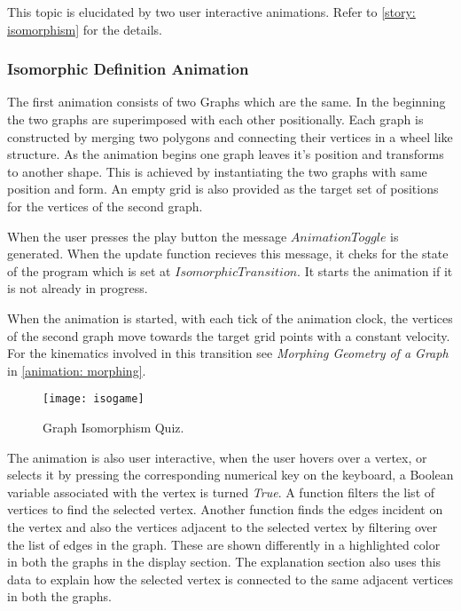 This topic is elucidated by two user interactive animations. Refer to
\autoref{story: isomorphism} for the details. 


\subsubsection{Isomorphic Definition Animation}
The first animation consists of two Graphs which are the same.  In the
beginning the two graphs are superimposed with each other positionally.  Each
graph is constructed by merging two polygons and connecting their vertices in a
wheel like structure. As the animation begins one graph leaves it's position
and transforms to another shape.  This is achieved by instantiating the two
graphs with same position and form. An empty grid is also provided as the
target set of positions for the vertices of the second graph. 

When the user presses the play button the message $AnimationToggle$ is
generated. When the update function recieves this message, it cheks for the
state of the program which is set at $IsomorphicTransition$. It starts the
animation if it is not already in progress.  

When the animation is started, with each tick of the animation clock, the
vertices of the second graph move towards the target grid points with a
constant velocity. For the kinematics involved in this transition see
\emph{Morphing Geometry of a Graph} in \autoref{animation: morphing}.

\begin{figure}[h]
\centering
\texttt{[image: isogame]}
\caption{
         Graph Isomorphism Quiz.
        }
\label{animationfigure: isomorphicGame}
\end{figure}
The animation is also user interactive, when the user hovers over a vertex, or
selects it by pressing the corresponding numerical key on the keyboard, a
Boolean variable associated with the vertex is turned \emph{True}. A function
filters the list of vertices to find the selected vertex. Another function
finds the edges incident on the vertex and also the vertices adjacent to the
selected vertex by filtering over the list of edges in the graph. These are
shown differently in a highlighted color in both the graphs in the display
section.  The explanation section also uses this data to explain how the
selected vertex is connected to the same adjacent vertices in both the graphs.

